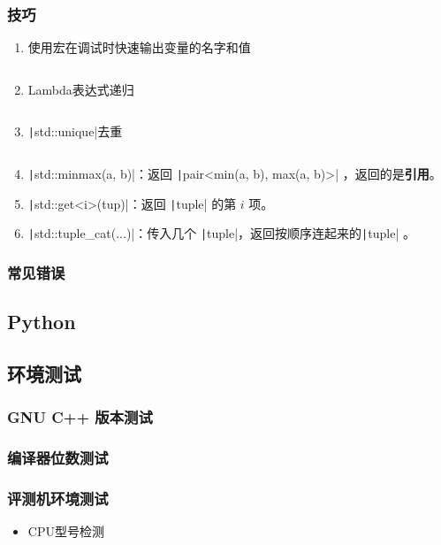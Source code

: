\documentclass[a4paper, twoside]{article}
\begin{document}
    \subsubsection{技巧}
    \begin{enumerate}
        \item 使用宏在调试时快速输出变量的名字和值
        \inputminted{cpp}{../src/附录/C++/debug宏.cpp}
        \item Lambda表达式递归
        \inputminted{cpp}{../src/附录/C++/Lambda表达式递归.cpp}
        \item \texttt|std::unique|去重
        \inputminted{cpp}{../src/附录/C++/std::unique去重.cpp}
        \item \texttt|std::minmax(a, b)|：返回 \texttt|pair<min(a, b), max(a, b)>| ，返回的是\textbf{引用}。
        \item \texttt|std::get<i>(tup)|：返回 \texttt|tuple| 的第 $i$ 项。
        \item \texttt|std::tuple_cat(...)|：传入几个 \texttt|tuple|，返回按顺序连起来的\texttt|tuple| 。

    \end{enumerate}
    
    \subsubsection{常见错误}

\subsection{Python}

\subsection{环境测试}
    \subsubsection{GNU C++ 版本测试}

    \subsubsection{编译器位数测试}

    \subsubsection{评测机环境测试}
    \begin{itemize}
        \item CPU型号检测
        \inputminted{cpp}{../src/附录/环境测试/CPU型号检测.cpp}
    \end{itemize}
\end{document}

